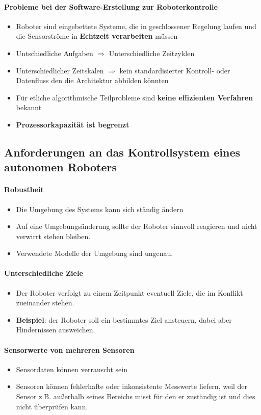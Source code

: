 \paragraph{Probleme bei der Software-Erstellung zur Roboterkontrolle}
\begin{itemize}
	\item Roboter sind eingebettete Systeme, die in geschlossener Regelung laufen und die Sensorströme in \textbf{Echtzeit verarbeiten} müssen
	\item Untschiedliche Aufgaben $\Rightarrow$ Unterschiedliche Zeitzyklen
	\item Unterschiedlicher Zeitskalen $\Rightarrow$ kein standardisierter Kontroll- oder Datenfluss den die Architektur abbilden könnten
	\item Für etliche algorithmische Teilprobleme sind \textbf{keine effizienten Verfahren} bekannt
	\item \textbf{Prozessorkapazität ist begrenzt}
\end{itemize}
\subsection{Anforderungen an das Kontrollsystem eines autonomen Roboters}
\paragraph{Robustheit}
\begin{itemize}
	\item Die Umgebung des Systems kann sich ständig ändern
	\item Auf eine Umgebungsänderung sollte der Roboter sinnvoll reagieren und nicht verwirrt stehen bleiben.
	\item Verwendete Modelle der Umgebung sind ungenau.
\end{itemize}
\paragraph{Unterschiedliche Ziele}
\begin{itemize}
	\item Der Roboter verfolgt zu einem Zeitpunkt eventuell Ziele, die im Konflikt zueinander stehen.
	\item \textbf{Beispiel}: der Roboter soll ein bestimmtes Ziel ansteuern, dabei aber Hindernissen ausweichen.
\end{itemize}
\paragraph{Sensorwerte von mehreren Sensoren}
\begin{itemize}
	\item Sensordaten können verrauscht sein
	\item Sensoren können fehlerhafte oder inkonsistente Messwerte liefern, weil der Sensor z.B. außerhalb seines Bereichs misst für den er zuständig ist und dies nicht überprüfen kann.
\end{itemize}
